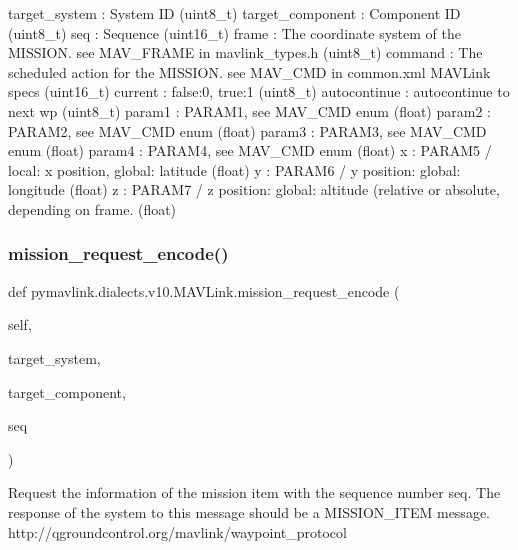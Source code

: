 \begin{DoxyVerb}
\begin{DoxyVerb}
\begin{DoxyVerb}
\begin{DoxyVerb}
\begin{DoxyVerb}
target_system             : System ID (uint8_t)
target_component          : Component ID (uint8_t)
seq                       : Sequence (uint16_t)
frame                     : The coordinate system of the MISSION. see MAV_FRAME in mavlink_types.h (uint8_t)
command                   : The scheduled action for the MISSION. see MAV_CMD in common.xml MAVLink specs (uint16_t)
current                   : false:0, true:1 (uint8_t)
autocontinue              : autocontinue to next wp (uint8_t)
param1                    : PARAM1, see MAV_CMD enum (float)
param2                    : PARAM2, see MAV_CMD enum (float)
param3                    : PARAM3, see MAV_CMD enum (float)
param4                    : PARAM4, see MAV_CMD enum (float)
x                         : PARAM5 / local: x position, global: latitude (float)
y                         : PARAM6 / y position: global: longitude (float)
z                         : PARAM7 / z position: global: altitude (relative or absolute, depending on frame. (float)\end{DoxyVerb}
 \mbox{\label{classpymavlink_1_1dialects_1_1v10_1_1MAVLink_a988b1fb4a08284f9badb42e7c2feddb2}} 
\subsubsection{\texorpdfstring{mission\+\_\+request\+\_\+encode()}{mission\_request\_encode()}}
{\footnotesize\ttfamily def pymavlink.\+dialects.\+v10.\+M\+A\+V\+Link.\+mission\+\_\+request\+\_\+encode (\begin{DoxyParamCaption}\item[{}]{self,  }\item[{}]{target\+\_\+system,  }\item[{}]{target\+\_\+component,  }\item[{}]{seq }\end{DoxyParamCaption})}

\begin{DoxyVerb}Request the information of the mission item with the sequence number
seq. The response of the system to this message should
be a MISSION_ITEM message.
http://qgroundcontrol.org/mavlink/waypoint_protocol


\end{DoxyVerb}
\end{DoxyVerb}
\end{DoxyVerb}
\end{DoxyVerb}
\end{DoxyVerb}
